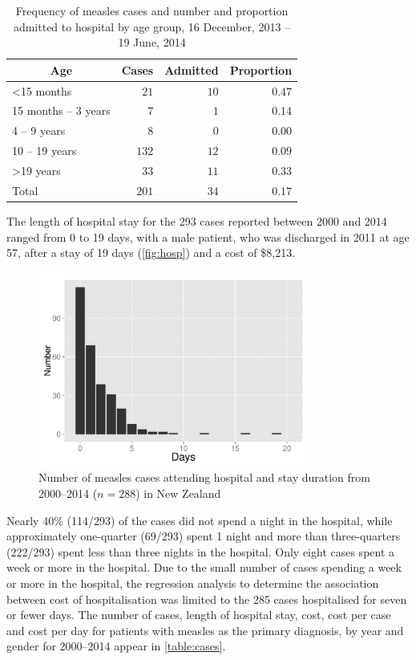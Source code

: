 \documentclass{article}
\begin{document}
\begin{table}
\begin{center}
\begin{tabular}{lrrr}
\hline\hline
\multicolumn{1}{c}{Age}&\multicolumn{1}{c}{Cases}&\multicolumn{1}{c}{Admitted}&\multicolumn{1}{c}{Proportion}\tabularnewline
\hline
\textless  15 months&$ 21$&$10$&$0.47$\tabularnewline
15 months – 3 years&$  7$&$ 1$&$0.14$\tabularnewline
4 – 9 years&$  8$&$ 0$&$0.00$\tabularnewline
10 – 19 years&$132$&$12$&$0.09$\tabularnewline
\textgreater  19 years&$ 33$&$11$&$0.33$\tabularnewline
Total&$201$&$34$&$0.17$\tabularnewline
\hline
\end{tabular}\end{center}\caption{Frequency of measles cases and number and proportion admitted to hospital by age group, 16 December, 2013 -- 19 June, 2014}
\label{table:freq}
\end{table}

The length of hospital stay for the 293 cases reported between 2000 and 2014 ranged from 0 to 19 days, with a male patient, who was discharged in 2011 at age 57, after a stay of 19 days (\autoref{fig:hosp}) and a cost of \$8,213.

\begin{figure}
\begin{center}
     \includegraphics[width=0.8\textwidth]{p.pdf}
\end{center}
\caption{Number of measles cases attending hospital and stay duration from 2000--2014 ($n=288$) in New Zealand}
\label{fig:hosp}
\end{figure}

Nearly 40\% (114/293) of the cases did not spend a night in the hospital, while approximately one-quarter (69/293) spent 1 night and more than three-quarters (222/293) spent less than three nights in the hospital. Only eight cases spent a week or more in the hospital. Due to the small number of cases spending a week or more in the hospital, the regression analysis to determine the association between cost of hospitalisation was limited to the 285 cases hospitalised for seven or fewer days. The number of cases, length of hospital stay, cost, cost per case and cost per day for patients with measles as the primary diagnosis, by year and gender for 2000--2014 appear in \autoref{table:cases}.
\end{document}
